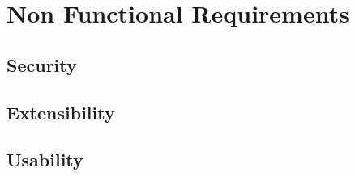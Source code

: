 \section{Non Functional Requirements}

\subsection{Security}

\subsection{Extensibility}

\subsection{Usability}

